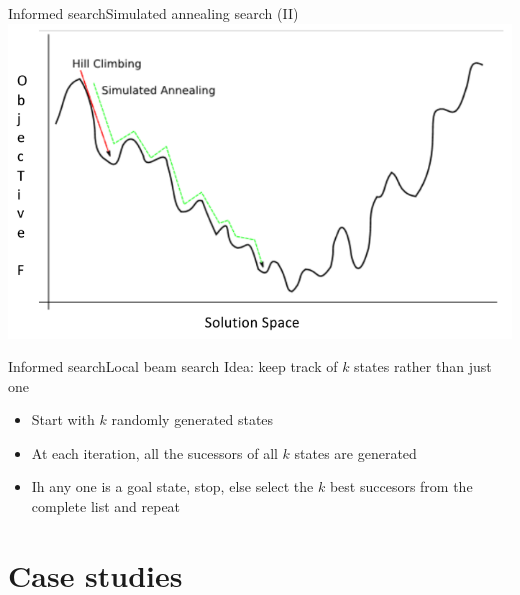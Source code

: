 \documentclass[10pt,compress]{beamer} %
\begin{document}
\begin{frame}{Informed search}{Simulated annealing search (II)}
        \includegraphics[width=0.7\linewidth]{figs/sa.png}\\
\end{frame}

\begin{frame}{Informed search}{Local beam search}
    Idea: keep track of $k$ states rather than just one
    \begin{itemize}
        \item Start with $k$ randomly generated states
        \item At each iteration, all the sucessors of all $k$ states are generated
        \item Ih any one is a goal state, stop, else select the $k$ best succesors from the complete list and repeat
    \end{itemize}
\end{frame}



\section{Case studies}

\end{document}
